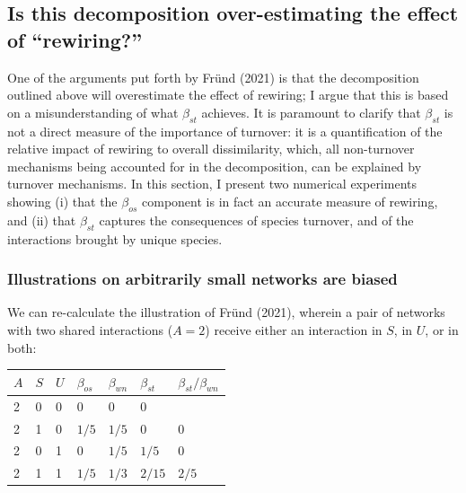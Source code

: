 \documentclass[11pt]{article}
\begin{document}
\hypertarget{is-this-decomposition-over-estimating-the-effect-of-rewiring}{%
\subsection{Is this decomposition over-estimating the effect of
``rewiring?''}\label{is-this-decomposition-over-estimating-the-effect-of-rewiring}}

One of the arguments put forth by Fründ (2021) is that the decomposition
outlined above will overestimate the effect of rewiring; I argue that
this is based on a misunderstanding of what \(\beta_{st}\) achieves. It
is paramount to clarify that \(\beta_{st}\) is not a direct measure of
the importance of turnover: it is a quantification of the relative
impact of rewiring to overall dissimilarity, which, all non-turnover
mechanisms being accounted for in the decomposition, can be explained by
turnover mechanisms. In this section, I present two numerical
experiments showing (i) that the \(\beta_{os}\) component is in fact an
accurate measure of rewiring, and (ii) that \(\beta_{st}\) captures the
consequences of species turnover, and of the interactions brought by
unique species.

\hypertarget{illustrations-on-arbitrarily-small-networks-are-biased}{%
\subsubsection{Illustrations on arbitrarily small networks are
biased}\label{illustrations-on-arbitrarily-small-networks-are-biased}}

We can re-calculate the illustration of Fründ (2021), wherein a pair of
networks with two shared interactions (\(A = 2\)) receive either an
interaction in \(S\), in \(U\), or in both:

\begin{longtable}[]{@{}lllllll@{}}
\toprule
\(A\) & \(S\) & \(U\) & \(\beta_{os}\) & \(\beta_{wn}\) & \(\beta_{st}\)
& \(\beta_{st}/\beta_{wn}\)\tabularnewline
\midrule
\endhead
2 & 0 & 0 & 0 & 0 & 0 &\tabularnewline
2 & 1 & 0 & \(1/5\) & \(1/5\) & 0 & 0\tabularnewline
2 & 0 & 1 & 0 & \(1/5\) & \(1/5\) & 0\tabularnewline
2 & 1 & 1 & \(1/5\) & \(1/3\) & \(2/15\) & \(2/5\)\tabularnewline
\bottomrule
\end{longtable}
\end{document}
